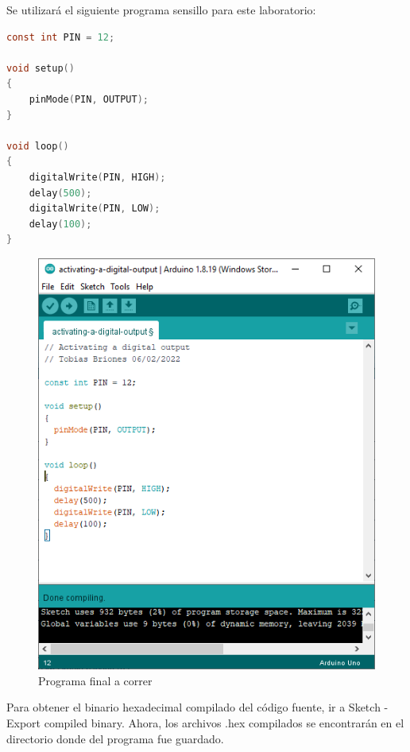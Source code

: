 \documentclass{article}
\begin{document}
    \bigbreak

    Se utilizará el siguiente programa sensillo para este laboratorio:

    \begin{lstlisting}[language=C, caption=Programa para activar una salida
    digital]
const int PIN = 12;

void setup()
{
    pinMode(PIN, OUTPUT);
}

void loop()
{
    digitalWrite(PIN, HIGH);
    delay(500);
    digitalWrite(PIN, LOW);
    delay(100);
}
    \end{lstlisting}

    \begin{figure}[H]
        \centering
        \includegraphics[width=0.3\paperwidth]{images/arduino-2}
        \caption{Programa final a correr}
    \end{figure}

    Para obtener el binario hexadecimal compilado del código fuente, ir a
    Sketch - Export compiled binary.
    Ahora, los archivos .hex compilados se encontrarán en el directorio donde
    del programa fue guardado.
\end{document}
